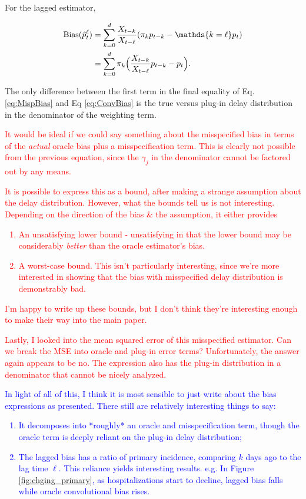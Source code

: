 \documentclass{article}
\begin{document}
For the lagged estimator,

\begin{align}\label{eq:LagBias}
    \text{Bias}(\hat{p}_t^\ell) &=  \sum_{k=0}^d \frac{X_{t-k}}{X_{t-\ell}}(\pi_k p_{t-k}-\mathds\{k=\ell\} p_t) \nonumber \\
    &= \sum_{k=0}^d \pi_k \Big(\frac{X_{t-k}}{X_{t-\ell}} p_{t-k} - p_{t} \Big).
\end{align}

The only difference between the first term in the final equality of Eq. \ref{eq:MispBias} and Eq \ref{eq:ConvBias} is the true versus plug-in delay distribution in the denominator of the weighting term. 

\textcolor{red}{It would be ideal if we could say something about the misspecified bias in terms of the \textit{actual} oracle bias plus a misspecification term. This is clearly not possible from the previous equation, since the $\gamma_j$ in the denominator cannot be factored out by any means.}

\textcolor{red}{It is possible to express this as a bound, after making a strange assumption about the delay distribution. However, what the bounds tell us is not interesting. Depending on the direction of the bias \& the assumption, it either provides 
\begin{enumerate}
    \item An unsatisfying lower bound - unsatisfying in that the lower bound may be considerably \textit{better} than the oracle estimator's bias.
    \item A worst-case bound. This isn't particularly interesting, since we're more interested in showing that the bias with misspecified delay distribution is demonstrably bad.
\end{enumerate}
I'm happy to write up these bounds, but I don't think they're interesting enough to make their way into the main paper.}

\textcolor{red}{Lastly, I looked into the mean squared error of this misspecified estimator. Can we break the MSE into oracle and plug-in error terms? Unfortunately, the answer again appears to be no. The expression also has the plug-in distribution in a denominator that cannot be nicely analyzed.}

\textcolor{blue}{In light of all of this, I think it is most sensible to just write about the bias expressions as presented. There still are relatively interesting things to say:
\begin{enumerate}
    \item It decomposes into *roughly* an oracle and misspecification term, though the oracle term is deeply reliant on the plug-in delay distribution;
    \item The lagged bias has a ratio of primary incidence, comparing $k$ days ago to the lag time $\ell$. This reliance yields interesting results. e.g. In Figure \ref{fig:chging_primary}, as hospitalizations start to decline, lagged bias falls while oracle convolutional bias rises.
\end{enumerate}}
\end{document}
